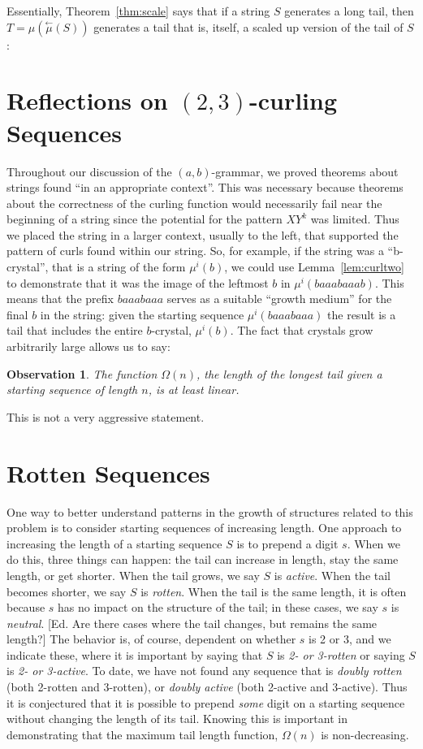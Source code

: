 \documentclass[11pt]{article}
\def\emph#1{{\em #1\/}}
\def\term#1{\emph{#1}}
\newcounter{thm}
\newtheorem{observation}[thm]{Observation}
\def\ni{\noindent}
\def\ab{$(a,b)$}
\def\twth{$(2,3)$}
\def\abg{\ab-grammar}
\def\la#1{\overset{\leftarrow}{#1}}
\def\rmu{\la{\mu}}
\begin{document}
Essentially, Theorem~\ref{thm:scale} says that if a string $S$ generates
a long tail, then $T=\mu(\rmu(S))$ generates a tail that is, itself,
a scaled up version of the tail of $S$:


\section{Reflections on \twth-curling Sequences}\label{sect:reflections}
Throughout our discussion of the \abg, we proved theorems about strings
found ``in an appropriate context''.  This was necessary because theorems
about the correctness of the curling function would necessarily fail near
the beginning of a string since the potential for the pattern $XY^k$ was
limited.  Thus we placed the string in a larger context,
usually to the left, that supported the pattern of curls found within our
string.  So, for example, if the string was a ``b-crystal'', that is a string
of the form $\mu^i(b)$, we could use Lemma~\ref{lem:curltwo} to demonstrate
that it was the image of the leftmost $b$ in $\mu^{i}(baaabaaab)$.  This
means that the prefix $baaabaaa$ serves as a suitable ``growth medium'' for the
final $b$ in the string: given the starting sequence $\mu^i(baaabaaa)$
the result is a tail that includes the entire $b$-crystal, $\mu^i(b)$.  The
fact that crystals grow arbitrarily large allows us to say:

\begin{observation}
The function $\Omega(n)$, the length of the longest tail given a starting
sequence of length $n$, is at least linear.
\end{observation}

\ni This is not a very aggressive statement.

\section{Rotten Sequences}\label{sect:rotten}
One way to better understand patterns in the growth of structures related to this problem is to consider starting sequences of increasing length.
One approach to increasing the length of a starting sequence $S$ is to prepend a
digit $s$.  When we do this, three things can happen: the tail can increase 
in length, stay the same length, or get shorter.  When the tail grows, we
say $S$ is \term{active}.  When the tail becomes shorter, we say $S$ is
\term{rotten}.  When the tail is the same length, it is often because $s$
has no impact on the structure of the tail; in these cases, we say $s$ is
\term{neutral}.  [Ed. Are there cases where the tail changes, but remains
the same length?]  The behavior is, of course, dependent on whether $s$ is
2 or 3, and we indicate these, where it is important by saying that $S$ is
\term{2- or 3-rotten} or saying $S$ is \term{2- or 3-active}.  To date,
we have not found any sequence that is \term{doubly rotten} (both 2-rotten and 3-rotten), or \term{doubly active} (both 2-active and 3-active).  Thus it 
is conjectured that it is possible to prepend \emph{some} digit on a starting sequence without changing the length of its tail.  Knowing this is important
in demonstrating that the maximum tail length function, $\Omega(n)$ is 
non-decreasing.
\end{document}
